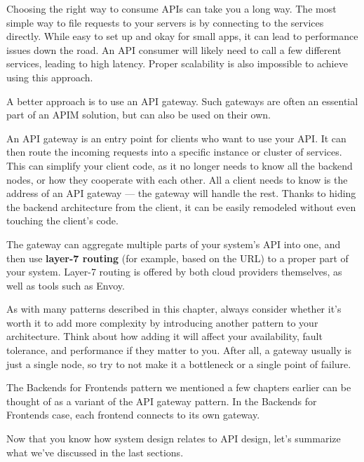 Choosing the right way to consume APIs can take you a long way. The most simple way to file requests to your servers is by connecting to the services directly. While easy to set up and okay for small apps, it can lead to performance issues down the road. An API consumer will likely need to call a few different services, leading to high latency. Proper scalability is also impossible to achieve using this approach.

A better approach is to use an API gateway. Such gateways are often an essential part of an APIM solution, but can also be used on their own.


An API gateway is an entry point for clients who want to use your API. It can then route the incoming requests into a specific instance or cluster of services. This can simplify your client code, as it no longer needs to know all the backend nodes, or how they cooperate with each other. All a client needs to know is the address of an API gateway — the gateway will handle the rest. Thanks to hiding the backend architecture from the client, it can be easily remodeled without even touching the client's code.

The gateway can aggregate multiple parts of your system's API into one, and then use \textbf{layer-7 routing} (for example, based on the URL) to a proper part of your system. Layer-7 routing is offered by both cloud providers themselves, as well as tools such as Envoy.

As with many patterns described in this chapter, always consider whether it's worth it to add more complexity by introducing another pattern to your architecture. Think about how adding it will affect your availability, fault tolerance, and performance if they matter to you. After all, a gateway usually is just a single node, so try to not make it a bottleneck or a single point of failure.

The Backends for Frontends pattern we mentioned a few chapters earlier can be thought of as a variant of the API gateway pattern. In the Backends for Frontends case, each frontend connects to its own gateway.

Now that you know how system design relates to API design, let's summarize what we've discussed in the last sections.











